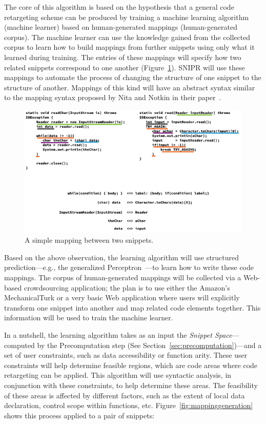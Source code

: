 The core of this algorithm is based on the hypothesis that a general code retargeting scheme can be produced by training a machine learning algorithm (machine learner) based on human-generated mappings (human-generated corpus). The machine learner can use the knowledge gained from the collected corpus to learn how to build mappings from further snippets using only what it learned during training. The entries of these mappings will specify how two related snippets correspond to one another (Figure~\ref{fig:mappings}). SNIPR will use these mappings to automate the process of changing the structure of one snippet to the structure of another. Mappings of this kind will have an abstract syntax similar to the mapping syntax proposed by Nita and Notkin in their paper~\cite{Nita:2010en}.

\begin{figure}[!ht]
    \centering
    \includegraphics[width=\textwidth]{images/mappings}
    \caption{A simple mapping between two snippets.}
    \label{fig:mappings}
\end{figure}

Based on the above observation, the learning algorithm will use structured prediction---e.g., the generalized Perceptron~\cite{Collins:2002uo}---to learn how to write these code mappings. The corpus of human-generated mappings will be collected via a Web-based crowdsourcing application; the plan is to use either the Amazon's MechanicalTurk or a very basic Web application where users will explicitly transform one snippet into another and map related code elements together. This information will be used to train the machine learner.

In a nutshell, the learning algorithm takes as an input the \emph{Snippet Space}---computed by the Precomputation step (See Section~\ref{sec:precomputation})---and a set of user constraints, such as data accessibility or function arity. These user constraints will help determine feasible regions, which are code areas where code retargeting can be applied. This algorithm will use syntactic analysis, in conjunction with these constraints, to help determine these areas. The feasibility of these areas is affected by different factors, such as the extent of local data declaration, control scope within functions, etc. Figure~\ref{fig:mappinggeneration} shows this process applied to a pair of snippets:

